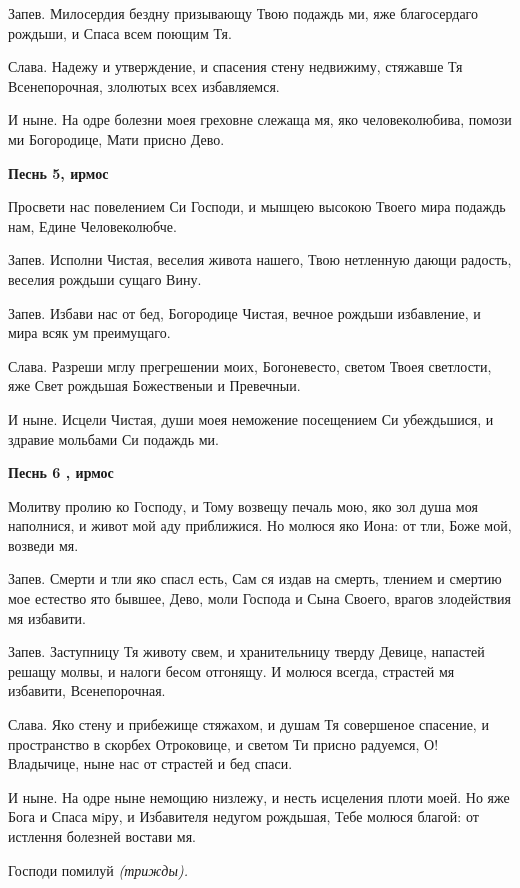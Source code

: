 Запев. Милосердия бездну призывающу Твою подаждь ми, яже благосердаго рождьши, и Спаса всем поющим Тя.


Слава. Надежу и утверждение, и спасения стену недвижиму, стяжавше Тя Всенепорочная, злолютых всех избавляемся.


И ныне. На одре болезни моея греховне слежаща мя, яко человеколюбива, помози ми Богородице, Мати присно Дево.





\bfseries Песнь 5, ирмос\normalfont{}


Просвети нас повелением Си Господи, и мышцею высокою Твоего мира подаждь нам, Едине Человеколюбче.


Запев. Исполни Чистая, веселия живота нашего, Твою нетленную дающи радость, веселия рождьши сущаго Вину.


Запев. Избави нас от бед, Богородице Чистая, вечное рождьши избавление, и мира всяк ум преимущаго.


Слава. Разреши мглу прегрешении моих, Богоневесто, светом Твоея светлости, яже Свет рождьшая Божественыи и Превечныи.


И ныне. Исцели Чистая, души моея неможение посещением Си убеждьшися, и здравие мольбами Си подаждь ми.





\bfseries Песнь 6 , ирмос\normalfont{}


Молитву пролию ко Господу, и Тому возвещу печаль мою, яко зол душа моя наполнися, и живот мой аду приближися. Но молюся яко Иона: от тли, Боже мой, возведи мя.


Запев. Смерти и тли яко спасл есть, Сам ся издав на смерть, тлением и смертию мое естество ято бывшее, Дево, моли Господа и Сына Своего, врагов злодействия мя избавити.


Запев. Заступницу Тя животу свем, и хранительницу тверду Девице, напастей решащу молвы, и налоги бесом отгонящу. И молюся всегда, страстей мя избавити, Всенепорочная.


Слава. Яко стену и прибежище стяжахом, и душам Тя совершеное спасение, и пространство в скорбех Отроковице, и светом Ти присно радуемся, О! Владычице, ныне нас от страстей и бед спаси.


И ныне. На одре ныне немощию низлежу, и несть исцеления плоти моей. Но яже Бога и Спаса мiру, и Избавителя недугом рождьшая, Тебе молюся благой: от истлення болезней востави мя.


Господи помилуй \itshape (трижды)\normalfont{}.



